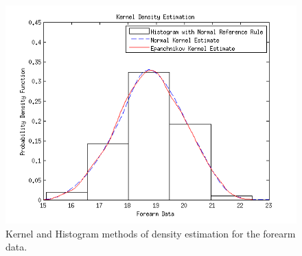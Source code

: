 \documentclass[12pt,a4paper]{article}
\begin{document}
\begin{figure}[ht!] 
\begin{center}
\includegraphics[scale=1]{q9p21_graph1.png}
\caption{Kernel and Histogram methods of density estimation for the forearm data.}
\label{q21 fig1}
\end{center}
\end{figure}
\FloatBarrier
\end{document}
